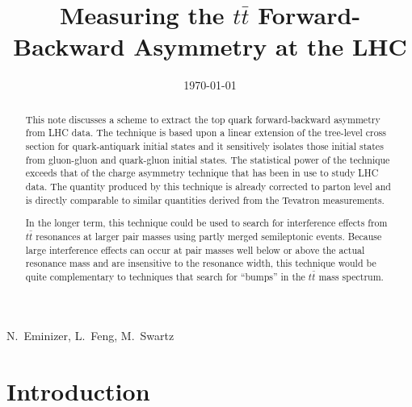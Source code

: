 \documentclass{cmspaperpdf}
\begin{document}
\begin{titlepage}

  \date{\today}

  \title{Measuring the $t\bar t$ Forward-Backward Asymmetry at the LHC}

  \begin{Authlist}
    N.~Eminizer, L.~Feng, M.~Swartz
  \end{Authlist}


  \begin{abstract}
This note discusses a scheme to extract the top quark forward-backward asymmetry from LHC data.  The technique is based upon a linear extension of the tree-level cross section for quark-antiquark initial states and it sensitively isolates those initial states from gluon-gluon and quark-gluon initial states.  The statistical power of the technique exceeds that of the charge asymmetry technique that has been in use to study LHC data.  The quantity produced by this technique is already corrected to parton level and is directly comparable to similar quantities derived from the Tevatron measurements.

In the longer term, this technique could be used to search for interference effects from $t\bar t$ resonances at larger pair masses using partly merged semileptonic events.  Because large interference effects can occur at pair masses well below or above the actual resonance mass and are insensitive to the resonance width, this technique would be quite complementary to techniques that search for ``bumps'' in the $t\bar t$ mass spectrum.
  \end{abstract} 

  
\end{titlepage}

\setcounter{page}{2}%


\section{Introduction}
\end{document}
